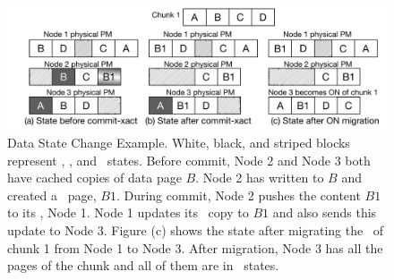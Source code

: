 {
\begin{figure}[th]
\centering
\begin{center}
\centerline{\includegraphics[width=\textwidth]{hotpot/Figures/data-eg.pdf}}
\end{center}
\caption[Data State Change Example.]
{Data State Change Example.
White, black, and striped blocks represent \committed, \redundant, and \dirty\ states.
Before commit, Node 2 and Node 3 both have cached copies of 
data page $B$. Node 2 has written to $B$ and created a \dirty\ page, $B1$.
During commit, Node 2 pushes the content $B1$ to its \on, Node 1.
Node 1 updates its \committed\ copy to $B1$ and also sends this update to Node 3.
Figure (c) shows the state after migrating the \on\ of chunk 1 from Node 1 to Node 3. 
After migration, Node 3 has all the pages of the chunk and all of them are in \committed\ states.
}
\label{fig-data-eg}
\end{figure}
}